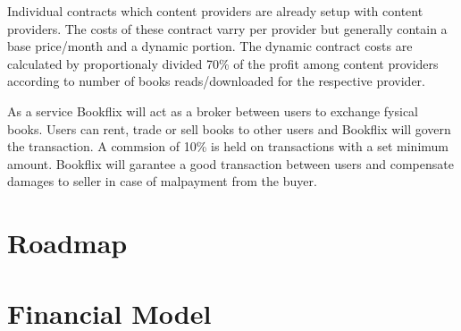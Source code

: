 Individual contracts which content providers are already setup with content providers.
The costs of these contract varry per provider but generally contain a base price/month and a dynamic portion.
The dynamic contract costs are calculated by proportionaly divided 70\% of the profit among content providers according to number of books reads/downloaded for the respective provider.

As a service Bookflix will act as a broker between users to exchange fysical books.
Users can rent, trade or sell books to other users and Bookflix will govern the transaction.
A commsion of 10\% is held on transactions with a set minimum amount.
Bookflix will garantee a good transaction between users and compensate damages to seller in case of malpayment from the buyer.

\section{Roadmap}
\section{Financial Model}
